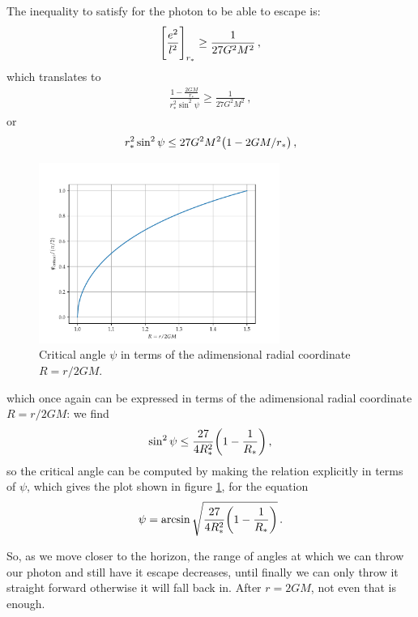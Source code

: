 \documentclass[main.tex]{subfiles}
\begin{document}
The inequality to satisfy for the photon to be able to escape is: 
%
\begin{align}
  \qty[\frac{e^2}{l^2}]_{r_{*}} \geq \frac{1}{27G^2M^2}
\,,
\end{align}
%
which translates to 
%
\begin{align}
  \frac{1 - \frac{2GM}{r_{*}}}{r_{*}^2 \sin^2 \psi } \geq \frac{1}{27G^2M^2}
\,,
\end{align}
%
or 
%
\begin{align}
  r_{*}^2 \sin^2 \psi \leq 27G^2M^2 \qty(1 - 2GM/r_{*}) 
  \,,
\end{align}
%
\begin{figure}[ht]
  \centering
  \includegraphics[width=0.7\textwidth]{figures/critical_psi.pdf}
  \caption{Critical angle \(\psi \) in terms of the adimensional radial coordinate \(R = r/ 2GM\).}
  \label{fig:critical-psi}
\end{figure}
%
which once again can be expressed in terms of the adimensional radial coordinate \(R = r/2GM\): we find 
%
\begin{align}
  \sin^2 \psi \leq \frac{27}{4 R_{*}^2} \qty(1 - \frac{1}{R_{*}})
  \,,
\end{align}
%
so the critical angle can be computed by making the relation explicitly in terms of \(\psi \), which gives the plot shown in figure \ref{fig:critical-psi}, for the equation 
%
\begin{align}
  \psi = \arcsin \sqrt{\frac{27}{4 R_{*}^2} \qty(1 - \frac{1}{R_{*}})}
\,.
\end{align}
%

So, as we move closer to the horizon, the range of angles at which we can throw our photon and still have it escape decreases, until finally we can only throw it straight forward otherwise it will fall back in. After \(r = 2GM\), not even that is enough.  
\end{document}
